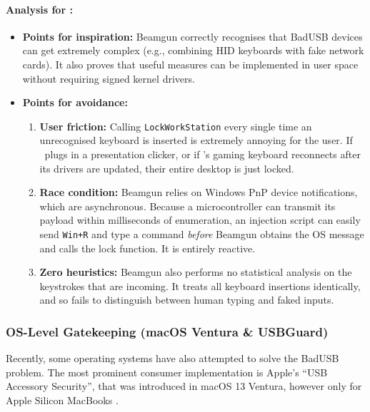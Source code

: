 \paragraph{Analysis for \projectNameFormatted :}
\begin{itemize}[leftmargin=*, nosep]
	\item \textbf{Points for inspiration:} Beamgun correctly recognises that BadUSB devices can get extremely complex (e.g., combining HID keyboards with fake network cards). It also proves that useful measures can be implemented in user space without requiring signed kernel drivers.
	\item \textbf{Points for avoidance:}
	      \begin{enumerate}[leftmargin=*, nosep]
		      \item \textbf{User friction:} Calling \texttt{LockWorkStation} every single time an unrecognised keyboard is inserted is extremely annoying for the user. If \stakeholdersTU\ plugs in a presentation clicker, or if \stakeholdersPU's gaming keyboard reconnects after its drivers are updated, their entire desktop is just locked.
		      \item \textbf{Race condition:} Beamgun relies on Windows PnP device notifications, which are asynchronous. Because a microcontroller can transmit its payload within milliseconds of enumeration, an injection script can easily send \texttt{Win+R} and type a command \textit{before} Beamgun obtains the OS message and calls the lock function. It is entirely reactive.
		      \item \textbf{Zero heuristics:} Beamgun also performs no statistical analysis on the keystrokes that are incoming. It treats all keyboard insertions identically, and so fails to distinguish between human typing and faked inputs.
	      \end{enumerate}
\end{itemize}

\subsubsection{OS-Level Gatekeeping (macOS Ventura \& USBGuard)}

Recently, some operating systems have also attempted to solve the BadUSB problem. The most prominent consumer implementation is Apple's ``USB Accessory Security'', that was introduced in macOS 13 Ventura, however only for Apple Silicon MacBooks \cite{appleAccessorySecurity}.

